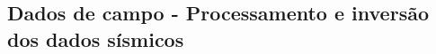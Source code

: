 \documentclass[a4paper, 12 pt]{article} %
\begin{document}

\clearpage 


\subsection{Dados de campo - Processamento e inversão dos dados sísmicos}
\end{document}
